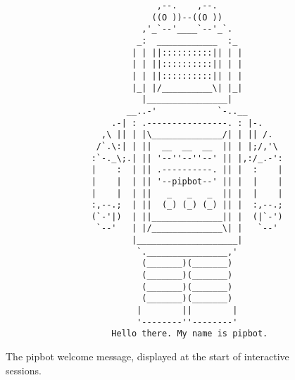 \begin{figure}[H]
\begin{verbatim}
                              ,--.    ,--.
                             ((O ))--((O ))
                           ,'_`--'____`--'_`.
                          _:  ____________  :_
                         | | ||::::::::::|| | |
                         | | ||::::::::::|| | |
                         | | ||::::::::::|| | |
                         |_| |/__________\| |_|
                           |________________|
                        __..-'            `-..__
                     .-| : .----------------. : |-.
                   ,\ || | |\______________/| | || /.
                  /`.\:| | ||  __  __  __  || | |;/,'\
                 :`-._\;.| || '--''--''--' || |,:/_.-':
                 |    :  | || .----------. || |  :    |
                 |    |  | || '--pipbot--' || |  |    |
                 |    |  | ||   _   _   _  || |  |    |
                 :,--.;  | ||  (_) (_) (_) || |  :,--.;
                 (`-'|)  | ||______________|| |  (|`-')
                  `--'   | |/______________\| |   `--'
                         |____________________|
                          `.________________,'
                           (_______)(_______)
                           (_______)(_______)
                           (_______)(_______)
                           (_______)(_______)
                          |        ||        |
                          '--------''--------'
                     Hello there. My name is pipbot.
\end{verbatim}
\caption[The pipbot welcome message]
  {The pipbot welcome message, displayed at the start of interactive sessions.}
\label{fig:pipbot-logo}
\end{figure}


